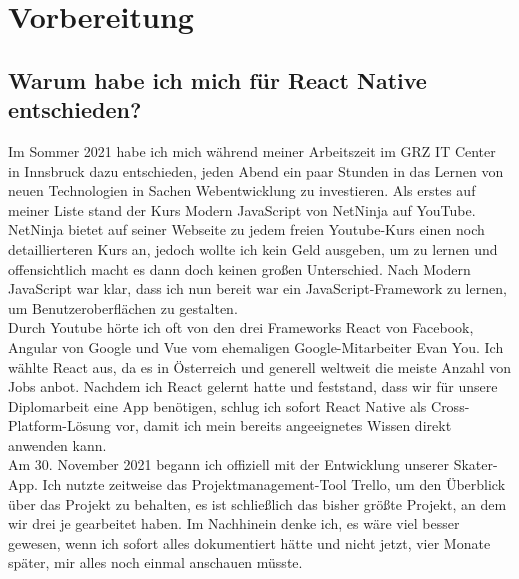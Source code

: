 \chapter{Vorbereitung}

\section{Warum habe ich mich für React Native entschieden?}
Im Sommer 2021 habe ich mich während meiner Arbeitszeit im GRZ IT Center in Innsbruck dazu
entschieden, jeden Abend ein paar Stunden in das Lernen von neuen Technologien in Sachen
Webentwicklung zu investieren. Als erstes auf meiner Liste stand der Kurs Modern JavaScript von
NetNinja auf YouTube. NetNinja bietet auf seiner Webseite zu jedem freien Youtube-Kurs einen noch
detaillierteren Kurs an, jedoch wollte ich kein Geld ausgeben, um zu lernen und offensichtlich macht
es dann doch keinen großen Unterschied. Nach Modern JavaScript war klar, dass ich nun bereit war ein
JavaScript-Framework zu lernen, um Benutzeroberflächen zu gestalten. \\

Durch Youtube hörte ich oft von den drei Frameworks React von Facebook, Angular von Google und Vue
vom ehemaligen Google-Mitarbeiter Evan You. Ich wählte React aus, da es in Österreich und generell
weltweit die meiste Anzahl von Jobs anbot. Nachdem ich React gelernt hatte und feststand, dass wir
für unsere Diplomarbeit eine App benötigen, schlug ich sofort React Native als Cross-Platform-Lösung
vor, damit ich mein bereits angeeignetes Wissen direkt anwenden kann. \\

Am 30. November 2021 begann ich offiziell mit der Entwicklung unserer Skater-App. Ich nutzte
zeitweise das Projektmanagement-Tool Trello, um den Überblick über das Projekt zu behalten, es ist
schließlich das bisher größte Projekt, an dem wir drei je gearbeitet haben. Im Nachhinein denke ich,
es wäre viel besser gewesen, wenn ich sofort alles dokumentiert hätte und nicht jetzt, vier Monate
später, mir alles noch einmal anschauen müsste.